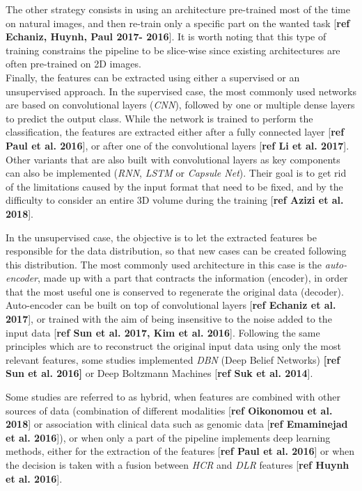 \documentclass[]{article}
\begin{document}
The other strategy consists in using an architecture pre-trained most of
the time on natural images, and then re-train only a specific part on
the wanted task {[}\textbf{ref Echaniz, Huynh, Paul 2017- 2016}{]}. It
is worth noting that this type of training constrains the pipeline to be
slice-wise since existing architectures are often pre-trained on 2D
images.\\
Finally, the features can be extracted using either a supervised or an
unsupervised approach. In the supervised case, the most commonly used
networks are based on convolutional layers (\emph{CNN}), followed by one
or multiple dense layers to predict the output class. While the network
is trained to perform the classification, the features are extracted
either after a fully connected layer {[}\textbf{ref Paul et al.
2016}{]}, or after one of the convolutional layers {[}\textbf{ref Li et
al. 2017}{]}.\\
Other variants that are also built with convolutional layers as key
components can also be implemented (\emph{RNN}, \emph{LSTM} or
\emph{Capsule Net}). Their goal is to get rid of the limitations caused
by the input format that need to be fixed, and by the difficulty to
consider an entire 3D volume during the training {[}\textbf{ref Azizi et
al. 2018}{]}.

In the unsupervised case, the objective is to let the extracted features
be responsible for the data distribution, so that new cases can be
created following this distribution. The most commonly used architecture
in this case is the \emph{auto-encoder}, made up with a part that
contracts the information (encoder), in order that the most useful one
is conserved to regenerate the original data (decoder). Auto-encoder can
be built on top of convolutional layers {[}\textbf{ref Echaniz et al.
2017}{]}, or trained with the aim of being insensitive to the noise
added to the input data {[}\textbf{ref Sun et al. 2017, Kim et al.
2016}{]}. Following the same principles which are to reconstruct the
original input data using only the most relevant features, some studies
implemented \emph{DBN} (Deep Belief Networks) \textbf{{[}ref Sun et al.
2016{]}} or Deep Boltzmann Machines {[}\textbf{ref Suk et al. 2014}{]}.

Some studies are referred to as hybrid, when features are combined with
other sources of data (combination of different modalities
{[}\textbf{ref Oikonomou et al. 2018}{]} or association with clinical
data such as genomic data {[}\textbf{ref Emaminejad et al. 2016}{]}), or
when only a part of the pipeline implements deep learning methods,
either for the extraction of the features {[}\textbf{ref Paul et al.
2016}{]} or when the decision is taken with a fusion between \emph{HCR}
and \emph{DLR} features {[}\textbf{ref Huynh et al. 2016}{]}.
\end{document}
